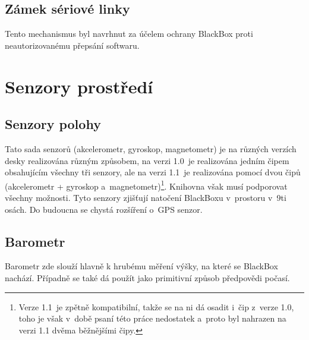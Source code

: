 \subsection{Zámek sériové linky}
Tento mechanismus byl navrhnut za účelem ochrany BlackBox proti neautorizovanému přepsání softwaru.

\section{Senzory prostředí}

\subsection{Senzory polohy}
Tato sada senzorů (akcelerometr, gyroskop, magnetometr) je na různých verzích desky realizována různým způsobem, na verzi 1.0~je realizována jedním čipem obsahujícím všechny tři senzory, ale na verzi 1.1~je realizována pomocí dvou čipů (akcelerometr + gyroskop a~magnetometr)\footnote{Verze 1.1~je zpětně kompatibilní, takže se na ni dá osadit i~čip z~verze 1.0, toho je však v~době psaní této práce nedostatek a~proto byl nahrazen na verzi 1.1 dvěma běžnějšími čipy.}.
Knihovna však musí podporovat všechny možnosti.
Tyto senzory zjišťují natočení BlackBoxu v~prostoru v~9ti osách.
Do budoucna se chystá rozšíření o~GPS senzor.

\subsection{Barometr}
Barometr zde slouží hlavně k hrubému měření výšky, na které se BlackBox nachází.
Případně se také dá použít jako primitivní způsob předpovědi počasí.